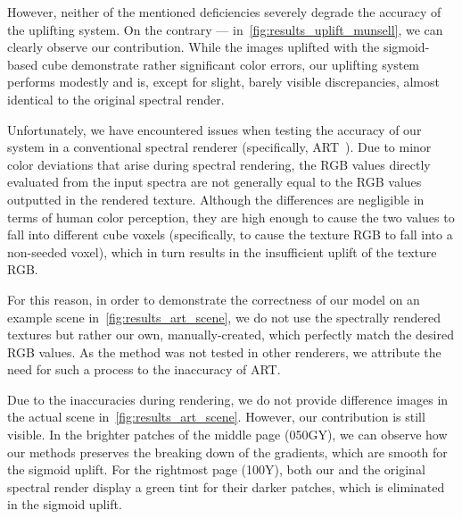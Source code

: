 However, neither of the mentioned deficiencies severely degrade the accuracy of the uplifting system. On the contrary --- in~\cref{fig:results_uplift_munsell}, we can clearly observe our contribution. While the images uplifted with the sigmoid-based cube demonstrate rather significant color errors, our uplifting system performs modestly and is, except for slight, barely visible discrepancies, almost identical to the original spectral render.

Unfortunately, we have encountered issues when testing the accuracy of our system in a conventional spectral renderer (specifically, ART~\cite{ART}). Due to minor color deviations that arise during spectral rendering, the RGB values directly evaluated from the input spectra are not generally equal to the RGB values outputted in the rendered texture. Although the differences are negligible in terms of human color perception, they are high enough to cause the two values to fall into different cube voxels (specifically, to cause the texture RGB to fall into a non-seeded voxel), which in turn results in the insufficient uplift of the texture RGB.

For this reason, in order to demonstrate the correctness of our model on an example scene in~\cref{fig:results_art_scene}, we do not use the spectrally rendered textures but rather our own, manually-created, which perfectly match the desired RGB values. As the method was not tested in other renderers, we attribute the need for such a process to the inaccuracy of ART. 

Due to the inaccuracies during rendering, we do not provide difference images in the actual scene in~\cref{fig:results_art_scene}. However, our contribution is still visible. In the brighter patches of the middle page (050GY), we can observe how our methods preserves the breaking down of the gradients, which are smooth for the sigmoid uplift. For the rightmost page (100Y), both our and the original spectral render display a green tint for their darker patches, which is eliminated in the sigmoid uplift.

